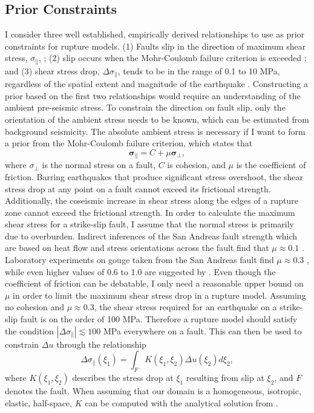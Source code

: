 \documentclass[12pt]{article}
\begin{document}
\subsection*{Prior Constraints}
I consider three well established, empirically derived relationships to use as prior constraints for rupture models. (1) Faults slip in the direction of maximum shear stress, $\sigma_\parallel$, \citep{Wallace1951}; (2) slip occurs when the Mohr-Coulomb failure criterion is exceeded \citep{Byerlee1978}; and (3) shear stress drop, $\Delta \sigma_\parallel$, tends to be in the range of 0.1 to 10 MPa, regardless of the spatial extent and magnitude of the earthquake \citep{Kanamori1975,Shearer2006}.  Constructing a prior based on the first two relationships would require an understanding of the ambient pre-seismic stress.  To constrain the direction on fault slip, only the orientation of the ambient stress needs to be known, which can be estimated from background seismicity.  The absolute ambient stress is necessary if I want to form a prior from the Mohr-Coulomb failure criterion, which states that
\begin{equation}\label{eq:MohrCoulomb}
  \mathbf{\sigma_\parallel} = C + \mu \mathbf{\sigma_\bot},
\end{equation}
where $\sigma_\bot$ is the normal stress on a fault, $C$ is cohesion, and $\mu$ is the coefficient of friction.  Barring earthquakes that produce significant stress overshoot, the shear stress drop at any point on a fault cannot exceed its frictional strength.  Additionally, the coseismic increase in shear stress along the edges of a rupture zone cannot exceed the frictional strength. In order to calculate the maximum shear stress for a strike-slip fault, I assume that the normal stress is primarily due to overburden.  Indirect inferences of the San Andreas fault strength which are based on heat flow and stress orientations across the fault find that $\mu\approx0.1$ \citep{Brune1969,Zoback1987}.  Laboratory experiments on gouge taken from the San Andreas fault find $\mu\approx0.3$ \citep{Carpenter2011}, while even higher values of 0.6 to 1.0 are suggested by \citet{Byerlee1978}. Even though the coefficient of friction can be debatable, I only need a reasonable upper bound on $\mu$ in order to limit the maximum shear stress drop in a rupture model.  Assuming no cohesion and $\mu\approx0.3$, the shear stress required for an earthquake on a strike-slip fault is on the order of 100 MPa.  Therefore a rupture model should satisfy the condition $|\Delta\sigma_\parallel|\lesssim 100$ MPa everywhere on a fault.  This can then be used to constrain $\Delta u$ through the relationship
\begin{equation}\label{eq:StressSlip}
  \Delta \sigma_\parallel (\xi_1) = \int_F K(\xi_1,\xi_2) \Delta u(\xi_2) d\xi_2,
\end{equation}
where $K(\xi_1,\xi_2)$ describes the stress drop at $\xi_1$ resulting from slip at $\xi_2$, and $F$ denotes the fault.  When assuming that our domain is a homogeneous, isotropic, elastic, half-space, $K$ can be computed with the analytical solution from \citet{Okada1992}.  
\end{document}

